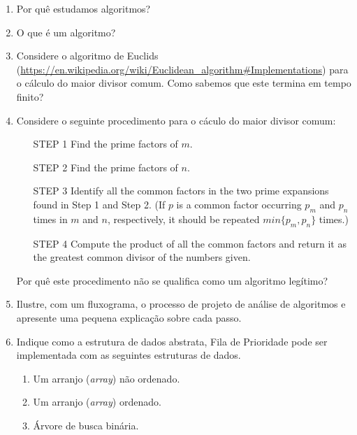 \documentclass{article}
\begin{document}
\begin{enumerate}
    \item Por quê estudamos algoritmos?
    \item O que é um algoritmo?
    \item Considere o algoritmo de Euclids (\url{https://en.wikipedia.org/wiki/Euclidean_algorithm#Implementations}) para o cálculo do maior divisor comum. Como sabemos que este termina em tempo finito?
    \item Considere o seguinte procedimento para o cáculo do maior divisor comum:
    \begin{enumerate} 
        \item[STEP 1] Find the prime factors of $m$.
        \item[STEP 2] Find the prime factors of $n$.
        \item[STEP 3] Identify all the common factors in the two prime expansions found in Step 1 and Step 2. (If $p$ is a common factor occurring $p_m$ and $p_n$ times in $m$ and $n$, respectively, it should be repeated $min\{p_m, p_n\}$ times.)
        \item[STEP 4] Compute the product of all the common factors and return it as the greatest common divisor of the numbers given.
    \end{enumerate}
    
    Por quê este procedimento não se qualifica como um algoritmo legítimo?
    
    
    \item Ilustre, com um fluxograma, o processo de projeto de análise de algoritmos e apresente uma pequena explicação sobre cada passo.
    
    \item Indique como a estrutura de dados abstrata, Fila de Prioridade pode ser implementada com as seguintes estruturas de dados.%
    \begin{enumerate}
        \item Um arranjo (\textit{array}) não ordenado.
        \item Um arranjo (\textit{array}) ordenado.
        \item Árvore de busca binária.
    \end{enumerate}


\end{enumerate}
\end{document}
